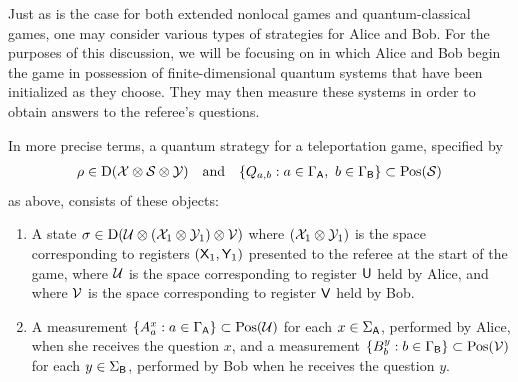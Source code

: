 Just as is the case for both extended nonlocal games and quantum-classical games, one may consider various types of strategies for Alice and Bob. For the purposes of this discussion, we will be focusing on  in which Alice and Bob begin the game in possession of finite-dimensional quantum systems that have been initialized as they choose. They may then measure these systems in order to obtain answers to the referee's questions. 

In more precise terms, a quantum strategy for a teleportation game, specified by 
	\begin{align}
		\rho \in \mathrm{D}(\mathcal{X} \otimes \mathcal{S} \otimes \mathcal{Y}) \quad \textnormal{and} \quad \{Q_{a,b} : a \in \Gamma_{\mathsf{A}}, \ b \in \Gamma_{\mathsf{B}} \} \subset \mathrm{Pos}(\mathcal{S})
	\end{align}
as above, consists of these objects:
\begin{enumerate}
	\item A state $\sigma \in \mathrm{D}(\mathcal{U} \otimes (\mathcal{X}_1 \otimes \mathcal{Y}_1) \otimes \mathcal{V})$ where $(\mathcal{X}_1 \otimes \mathcal{Y}_1)$ is the space corresponding to registers $(\mathsf{X}_1, \mathsf{Y}_1)$ presented to the referee at the start of the game, where $\mathcal{U}$ is the space corresponding to register $\mathsf{U}$ held by Alice, and where $\mathcal{V}$ is the space corresponding to register $\mathsf{V}$ held by Bob.
	\item A measurement $\{A_a^x : a \in \Gamma_{\mathsf{A}}\} \subset \mathrm{Pos}(\mathcal{U})$ for each $x \in \Sigma_{\mathsf{A}}$, performed by Alice, when she receives the question $x$, and a measurement $\{B_b^y : b \in \Gamma_{\mathsf{B}}\} \subset \mathrm{Pos}(\mathcal{V})$ for each $y \in \Sigma_{\mathsf{B}}$, performed by Bob when he receives the question $y$. 
\end{enumerate}


